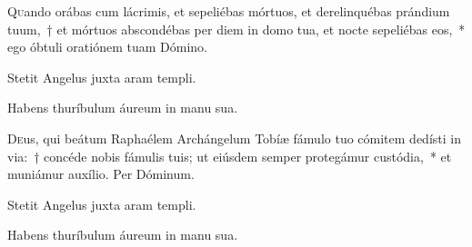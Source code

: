 \documentclass[vesperale_romanum.tex]{subfiles}
\begin{document}
\lettrine[depth=1]{Q}{u}ando orábas cum lácrimis, et sepeliébas mórtuos, et derelinquébas prándium tuum,~† et mórtuos abscondébas per diem in domo tua, et nocte sepeliébas eos,~* ego óbtuli oratiónem tuam Dómino.

\hymnus


\vv Stetit Angelus juxta aram templi.

\rr Habens thuríbulum áureum in manu sua.

\admagnificat


\oratio

 \lettrine{D}{e}us, qui beátum Raphaélem Archángelum Tobíæ fámulo tuo cómitem dedísti in via:~† concéde nobis fámulis tuis; ut eiúsdem semper protegámur custódia,~* et muniámur auxílio.
Per Dóminum.


\label{137_8c_oct}
{}


\vv Stetit Angelus juxta aram templi.

\rr Habens thuríbulum áureum in manu sua.

\admagnificat

\zerobaroffsettextleft
\zerobaroffsettextright
{}
\resetbaroffsettextleft
\resetbaroffsettextright

\commemoration

\myrule

\thispagestyle{empty}




 
 \label{109_8G_oct}
{}
 
\end{document}
